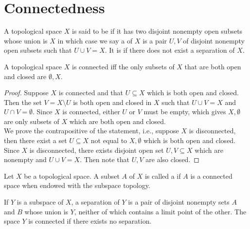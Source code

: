 \documentclass[11pt,a4paper]{article}
\begin{document}
\section{Connectedness}

\begin{mydef}
A topological space $X$ is said to be  if it has two disjoint nonempty open subsets whose union is $X$ in which case we say a  of $X$ is a pair $U, V$ of disjoint nonempty open subsets such that $U\cup V = X$. It is  if there does not exist a separation of $X$.
\end{mydef}

\begin{prop}
A topological space $X$ is connected iff the only subsets of $X$ that are both open and closed are $\emptyset, X$.
\end{prop}

\begin{proof}
\forward Suppose $X$ is connected and that $U\subseteq X$ which is both open and closed. Then the set $V = X\setminus U$ is both open and closed in $X$ such that $U\cup V = X$ and $U\cap V = \emptyset$. Since $X$ is connected, either $U$ or $V$ must be empty, which gives $X,\emptyset$ are only subsets of $X$ which are both open and closed.\\
\converse We prove the contrapositive of the statement, i.e., suppose $X$ is disconnected, then there exist a set $U\subseteq X$ not equal to $X,\emptyset$ which is both open and closed. Since $X$ is disconnected, there exists disjoint open set $U, V\subseteq X$ which are nonempty and $U\cup V = X$. Then note that $U, V$ are also closed.
\end{proof}

\begin{mydef}
Let $X$ be a topological space. A subset $A$ of $X$ is called a  if $A$ is a connected space when endowed with the subspace topology.
\end{mydef}

\begin{prop}
If $Y$ is a subspace of $X$, a separation of $Y$ is a pair of disjoint nonempty sets $A$ and $B$ whose union is $Y$, neither of which contains a limit point of the other. The space $Y$ is connected if there exists no separation. 
\end{prop}
\end{document}
